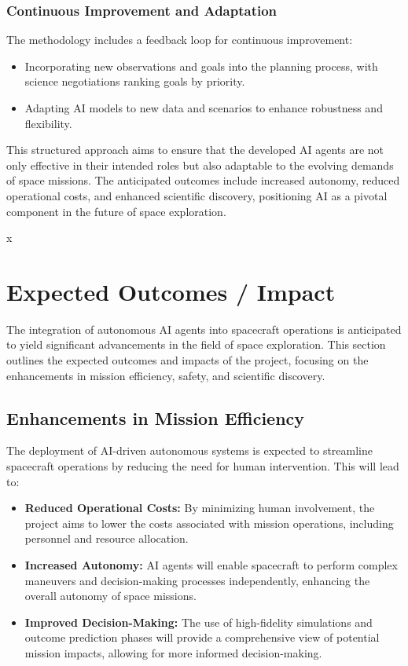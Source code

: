 \documentclass[a4paper,12pt]{article}
\begin{document}
\subsubsection{Continuous Improvement and Adaptation}

The methodology includes a feedback loop for continuous improvement:

\begin{itemize}
    \item Incorporating new observations and goals into the planning process, with science negotiations ranking goals by priority.
    \item Adapting AI models to new data and scenarios to enhance robustness and flexibility.
\end{itemize}

This structured approach aims to ensure that the developed AI agents are not only effective in their intended roles but also adaptable to the evolving demands of space missions. The anticipated outcomes include increased autonomy, reduced operational costs, and enhanced scientific discovery, positioning AI as a pivotal component in the future of space exploration.



x
\section{Expected Outcomes / Impact}

The integration of autonomous AI agents into spacecraft operations is anticipated to yield significant advancements in the field of space exploration. This section outlines the expected outcomes and impacts of the project, focusing on the enhancements in mission efficiency, safety, and scientific discovery.

\subsection{Enhancements in Mission Efficiency}

The deployment of AI-driven autonomous systems is expected to streamline spacecraft operations by reducing the need for human intervention. This will lead to:

\begin{itemize}
    \item \textbf{Reduced Operational Costs:} By minimizing human involvement, the project aims to lower the costs associated with mission operations, including personnel and resource allocation.
    \item \textbf{Increased Autonomy:} AI agents will enable spacecraft to perform complex maneuvers and decision-making processes independently, enhancing the overall autonomy of space missions.
    \item \textbf{Improved Decision-Making:} The use of high-fidelity simulations and outcome prediction phases will provide a comprehensive view of potential mission impacts, allowing for more informed decision-making.
\end{itemize}
\end{document}
